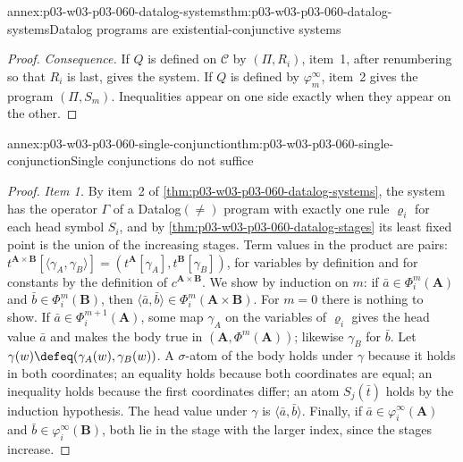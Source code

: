 \begin{annexitem}{annex:p03-w03-p03-060-datalog-systems}{thm:p03-w03-p03-060-datalog-systems}{Datalog programs are existential-conjunctive systems}
\begin{proof}
\emph{Consequence.} If \(Q\) is defined on \(\mathcal C\) by \((\Pi,R_i)\),
item~1, after renumbering so that \(R_i\) is last, gives the system. If
\(Q\) is defined by \(\varphi^\infty_m\), item~2 gives the program
\((\Pi,S_m)\). Inequalities appear on one side exactly when they appear on
the other.
\end{proof}
\end{annexitem}

\begin{annexitem}{annex:p03-w03-p03-060-single-conjunction}{thm:p03-w03-p03-060-single-conjunction}{Single conjunctions do not suffice}
\begin{proof}
\emph{Item 1.} By item~2 of \cref{thm:p03-w03-p03-060-datalog-systems},
the system has the operator \(\Gamma\) of a Datalog\((\neq)\) program with
exactly one rule \(\varrho_i\) for each head symbol \(S_i\), and by
\cref{thm:p03-w03-p03-060-datalog-stages} its least fixed point is the
union of the increasing stages. Term values in the product are pairs:
\(t^{\mathbf A\times\mathbf B}[\langle\gamma_A,\gamma_B\rangle]=(t^{\mathbf A}[\gamma_A],t^{\mathbf B}[\gamma_B])\),
for variables by definition and for constants by the definition of
\(c^{\mathbf A\times\mathbf B}\). We show by induction on \(m\): if
\(\bar a\in\Phi^m_i(\mathbf A)\) and \(\bar b\in\Phi^m_i(\mathbf B)\), then
\(\langle\bar a,\bar b\rangle\in\Phi^m_i(\mathbf A\times\mathbf B)\). For
\(m=0\) there is nothing to show. If \(\bar a\in\Phi^{m+1}_i(\mathbf A)\),
some map \(\gamma_A\) on the variables of \(\varrho_i\) gives the head
value \(\bar a\) and makes the body true in \((\mathbf A,\Phi^m(\mathbf A))\);
likewise \(\gamma_B\) for \(\bar b\). Let
\(\gamma(w)\defeq(\gamma_A(w),\gamma_B(w))\). A \(\sigma\)-atom of the body
holds under \(\gamma\) because it holds in both coordinates; an equality
holds because both coordinates are equal; an inequality holds because the
first coordinates differ; an atom \(S_j(\bar t)\) holds by the induction
hypothesis. The head value under \(\gamma\) is
\(\langle\bar a,\bar b\rangle\). Finally, if
\(\bar a\in\varphi^\infty_i(\mathbf A)\) and
\(\bar b\in\varphi^\infty_i(\mathbf B)\), both lie in the stage with the
larger index, since the stages increase.


\end{proof}
\end{annexitem}
